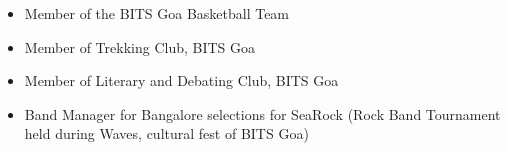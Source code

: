  {}

\vspace{1mm}
\begin{itemize}
\item Member of the BITS Goa Basketball Team
\item Member of Trekking Club, BITS Goa
\item Member of Literary and Debating Club, BITS Goa
\item Band Manager for Bangalore selections for SeaRock (Rock Band Tournament held during Waves, cultural fest of BITS Goa)
\end{itemize}